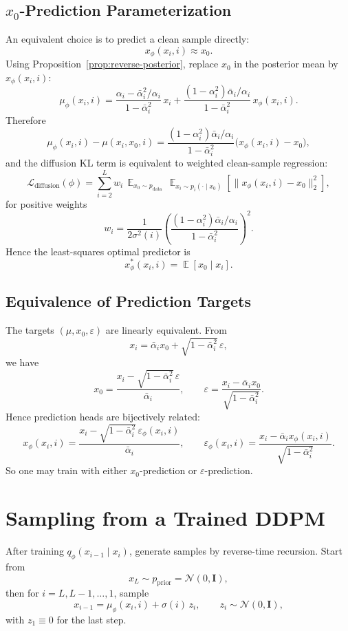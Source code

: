 \documentclass[11pt,a4paper]{article}
\DeclareMathOperator*{\E}{\mathbb{E}}
\newcommand{\cN}{\mathcal{N}}
\newcommand{\balpha}{\bar{\alpha}}
\newcommand{\pdata}{p_{\mathrm{data}}}
\newcommand{\pprior}{p_{\mathrm{prior}}}
\newcommand{\Ldiff}{\mathcal{L}_{\text{diffusion}}}
\begin{document}
\subsection{\texorpdfstring{$x_0$}{x0}-Prediction Parameterization}

An equivalent choice is to predict a clean sample directly:
\[
x_\phi(x_i,i)\approx x_0.
\]
Using Proposition~\ref{prop:reverse-posterior}, replace $x_0$ in the posterior mean by $x_\phi(x_i,i)$:
\[
\mu_\phi(x_i,i)
=\frac{\alpha_i-\balpha_i^2/\alpha_i}{1-\balpha_i^2}\,x_i
+\frac{(1-\alpha_i^2)\balpha_i/\alpha_i}{1-\balpha_i^2}\,x_\phi(x_i,i).
\]
Therefore
\[
\mu_\phi(x_i,i)-\mu(x_i,x_0,i)
=\frac{(1-\alpha_i^2)\balpha_i/\alpha_i}{1-\balpha_i^2}
\big(x_\phi(x_i,i)-x_0\big),
\]
and the diffusion KL term is equivalent to weighted clean-sample regression:
\[
\Ldiff(\phi)
=\sum_{i=2}^{L} w_i\,
\E_{x_0\sim\pdata}\,\E_{x_i\sim p_i(\cdot\mid x_0)}
\!\left[\|x_\phi(x_i,i)-x_0\|_2^2\right],
\]
for positive weights
\[
w_i
=\frac{1}{2\sigma^2(i)}
\left(
\frac{(1-\alpha_i^2)\balpha_i/\alpha_i}{1-\balpha_i^2}
\right)^2.
\]
Hence the least-squares optimal predictor is
\[
x_\phi^{*}(x_i,i)=\E[x_0\mid x_i].
\]

\subsection{Equivalence of Prediction Targets}

The targets $(\mu,x_0,\varepsilon)$ are linearly equivalent. From
\[
x_i=\balpha_i x_0+\sqrt{1-\balpha_i^2}\,\varepsilon,
\]
we have
\[
x_0=\frac{x_i-\sqrt{1-\balpha_i^2}\,\varepsilon}{\balpha_i},
\qquad
\varepsilon=\frac{x_i-\balpha_i x_0}{\sqrt{1-\balpha_i^2}}.
\]
Hence prediction heads are bijectively related:
\[
x_\phi(x_i,i)
=\frac{x_i-\sqrt{1-\balpha_i^2}\,\varepsilon_\phi(x_i,i)}{\balpha_i},
\qquad
\varepsilon_\phi(x_i,i)
=\frac{x_i-\balpha_i x_\phi(x_i,i)}{\sqrt{1-\balpha_i^2}}.
\]
So one may train with either $x_0$-prediction or $\varepsilon$-prediction.

\section{Sampling from a Trained DDPM}\label{sec:sampling}

After training $q_\phi(x_{i-1}\mid x_i)$, generate samples by reverse-time recursion.
Start from
\[
x_L\sim \pprior=\cN(0,\mathbf{I}),
\]
then for $i=L,L-1,\dots,1$, sample
\[
x_{i-1}
=\mu_\phi(x_i,i)+\sigma(i)\,z_i,\qquad
z_i\sim\cN(0,\mathbf{I}),
\]
with $z_1\equiv 0$ for the last step.
\end{document}
